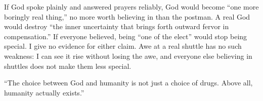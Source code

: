 If God spoke plainly and answered prayers reliably, God would become ``one more boringly real thing,'' no more worth believing in than the postman. A real God would destroy ``the inner uncertainty that brings forth outward fervor in compensation.'' If everyone believed, being ``one of the elect'' would stop being special. I give no evidence for either claim.  Awe at a real shuttle has no such weakness: I can see it rise without losing the awe, and everyone else believing in shuttles does not make them less special.

``The choice between God and humanity is not just a choice of drugs. Above all, humanity actually exists.'' 
